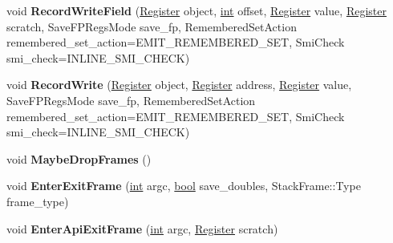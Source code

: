 \begin{DoxyCompactItemize}
\item 
\mbox{\label{classv8_1_1internal_1_1MacroAssembler_af5a27c24fb0d0688548e6ea7b0144792}} 
void {\bfseries Record\+Write\+Field} (\mbox{\hyperlink{classv8_1_1internal_1_1Register}{Register}} object, \mbox{\hyperlink{classint}{int}} offset, \mbox{\hyperlink{classv8_1_1internal_1_1Register}{Register}} value, \mbox{\hyperlink{classv8_1_1internal_1_1Register}{Register}} scratch, Save\+F\+P\+Regs\+Mode save\+\_\+fp, Remembered\+Set\+Action remembered\+\_\+set\+\_\+action=E\+M\+I\+T\+\_\+\+R\+E\+M\+E\+M\+B\+E\+R\+E\+D\+\_\+\+S\+ET, Smi\+Check smi\+\_\+check=I\+N\+L\+I\+N\+E\+\_\+\+S\+M\+I\+\_\+\+C\+H\+E\+CK)
\item 
\mbox{\label{classv8_1_1internal_1_1MacroAssembler_a502206b6b95126b45f40bd3c47dc6ab6}} 
void {\bfseries Record\+Write} (\mbox{\hyperlink{classv8_1_1internal_1_1Register}{Register}} object, \mbox{\hyperlink{classv8_1_1internal_1_1Register}{Register}} address, \mbox{\hyperlink{classv8_1_1internal_1_1Register}{Register}} value, Save\+F\+P\+Regs\+Mode save\+\_\+fp, Remembered\+Set\+Action remembered\+\_\+set\+\_\+action=E\+M\+I\+T\+\_\+\+R\+E\+M\+E\+M\+B\+E\+R\+E\+D\+\_\+\+S\+ET, Smi\+Check smi\+\_\+check=I\+N\+L\+I\+N\+E\+\_\+\+S\+M\+I\+\_\+\+C\+H\+E\+CK)
\item 
\mbox{\label{classv8_1_1internal_1_1MacroAssembler_a24c22317b3c647e2829321dade36cf73}} 
void {\bfseries Maybe\+Drop\+Frames} ()
\item 
\mbox{\label{classv8_1_1internal_1_1MacroAssembler_afd92e0a9ecfd2e1f47aaa89e29dd5a81}} 
void {\bfseries Enter\+Exit\+Frame} (\mbox{\hyperlink{classint}{int}} argc, \mbox{\hyperlink{classbool}{bool}} save\+\_\+doubles, Stack\+Frame\+::\+Type frame\+\_\+type)
\item 
\mbox{\label{classv8_1_1internal_1_1MacroAssembler_aff1c65e9dd64b018f5a66dc92196d6ee}} 
void {\bfseries Enter\+Api\+Exit\+Frame} (\mbox{\hyperlink{classint}{int}} argc, \mbox{\hyperlink{classv8_1_1internal_1_1Register}{Register}} scratch)
\item 
\mbox{\label{classv8_1_1internal_1_1MacroAssembler_acf4176f04bde51a8a61790248c1f2fc8}} 

\end{DoxyCompactItemize}
